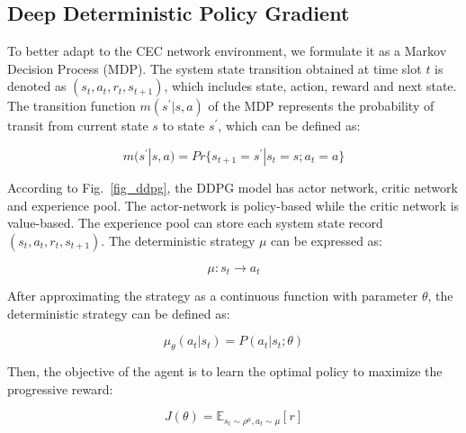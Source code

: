 \documentclass[10pt, conference, letterpaper]{IEEEtran}
\begin{document}


\subsection{Deep Deterministic Policy Gradient}
To better adapt to the CEC network environment, we formulate it as a Markov Decision Process (MDP). The system state transition obtained at time slot $t$ is denoted as $(s_t, a_t, r_t, s_{t+1})$, which includes state, action, reward and next state. The transition function $m(s^{\prime}|s, a)$ of the MDP represents the probability of transit from current state $s$ to state $s^{\prime}$, which can be defined as:

\begin{equation}
    m(s^{\prime}|s, a) = Pr\{s_{t+1} = s^{\prime}|s_{t} = s; a_{t} = a\}
\end{equation}

According to Fig.~\ref{fig_ddpg}, the DDPG model has actor network, critic network and experience pool. The actor-network is policy-based while the critic network is value-based. The experience pool can store each system state record $(s_t, a_t, r_t, s_{t+1})$. The deterministic strategy $\mu$ can be expressed as:

\begin{equation}
 \mu: s_t \rightarrow a_t
\end{equation}

After approximating the strategy as a continuous function with parameter $\theta$, the deterministic strategy can be defined as:

\begin{equation}
    \mu_\theta (a_t | s_t) = P(a_t | s_t; \theta)
\end{equation}

Then, the objective of the agent is to learn the optimal policy to maximize the progressive reward:

\begin{equation}
    J(\theta)=\mathbb{E}_{s_t \sim \rho^{\mu}, a_t \sim \mu}[r]
\end{equation}
\end{document}
